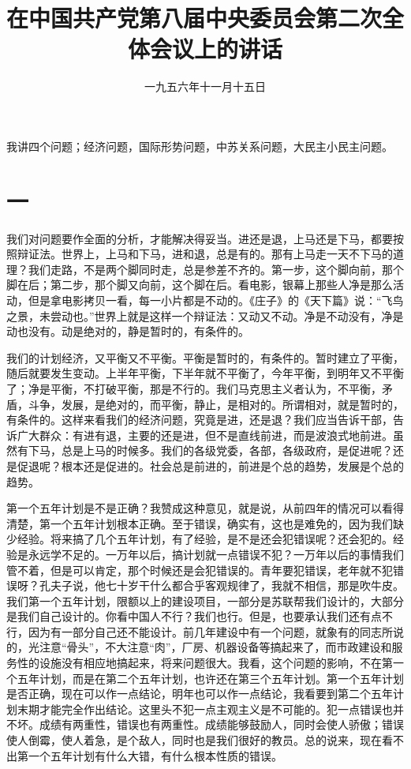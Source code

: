 
\title{在中国共产党第八届中央委员会第二次全体会议上的讲话}
\date{一九五六年十一月十五日}
\maketitle


我讲四个问题；经济问题，国际形势问题，中苏关系问题，大民主小民主问题。

\section*{一}

我们对问题要作全面的分析，才能解决得妥当。进还是退，上马还是下马，都要按照辩证法。世界上，上马和下马，进和退，总是有的。那有上马走一天不下马的道理？我们走路，不是两个脚同时走，总是参差不齐的。第一步，这个脚向前，那个脚在后；第二步，那个脚又向前，这个脚在后。看电影，银幕上那些人净是那么活动，但是拿电影拷贝一看，每一小片都是不动的。《庄子》的《天下篇》说：“飞鸟之景，未尝动也。”世界上就是这样一个辩证法：又动又不动。净是不动没有，净是动也没有。动是绝对的，静是暂时的，有条件的。

我们的计划经济，又平衡又不平衡。平衡是暂时的，有条件的。暂时建立了平衡，随后就要发生变动。上半年平衡，下半年就不平衡了，今年平衡，到明年又不平衡了；净是平衡，不打破平衡，那是不行的。我们马克思主义者认为，不平衡，矛盾，斗争，发展，是绝对的，而平衡，静止，是相对的。所谓相对，就是暂时的，有条件的。这样来看我们的经济问题，究竟是进，还是退？我们应当告诉干部，告诉广大群众：有进有退，主要的还是进，但不是直线前进，而是波浪式地前进。虽然有下马，总是上马的时候多。我们的各级党委，各部，各级政府，是促进呢？还是促退呢？根本还是促进的。社会总是前进的，前进是个总的趋势，发展是个总的趋势。

第一个五年计划是不是正确？我赞成这种意见，就是说，从前四年的情况可以看得清楚，第一个五年计划根本正确。至于错误，确实有，这也是难免的，因为我们缺少经验。将来搞了几个五年计划，有了经验，是不是还会犯错误呢？还会犯的。经验是永远学不足的。一万年以后，搞计划就一点错误不犯？一万年以后的事情我们管不着，但是可以肯定，那个时候还是会犯错误的。青年要犯错误，老年就不犯错误呀？孔夫子说，他七十岁干什么都合乎客观规律了，我就不相信，那是吹牛皮。我们第一个五年计划，限额以上的建设项目，一部分是苏联帮我们设计的，大部分是我们自己设计的。你看中国人不行？我们也行。但是，也要承认我们还有点不行，因为有一部分自己还不能设计。前几年建设中有一个问题，就象有的同志所说的，光注意“骨头”，不大注意“肉”，厂房、机器设备等搞起来了，而市政建设和服务性的设施没有相应地搞起来，将来问题很大。我看，这个问题的影响，不在第一个五年计划，而是在第二个五年计划，也许还在第三个五年计划。第一个五年计划是否正确，现在可以作一点结论，明年也可以作一点结论，我看要到第二个五年计划末期才能完全作出结论。这里头不犯一点主观主义是不可能的。犯一点错误也并不坏。成绩有两重性，错误也有两重性。成绩能够鼓励人，同时会使人骄傲；错误使人倒霉，使人着急，是个敌人，同时也是我们很好的教员。总的说来，现在看不出第一个五年计划有什么大错，有什么根本性质的错误。

